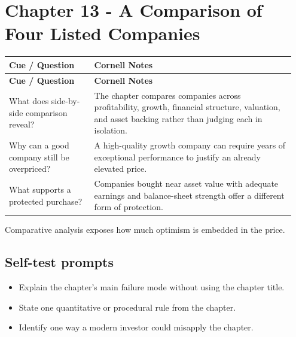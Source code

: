 \documentclass[11pt]{article}
\begin{document}
\section{Chapter 13 - A Comparison of Four Listed Companies}
\begin{longtable}{@{}>{\raggedright\arraybackslash}p{0.29\linewidth}>{\raggedright\arraybackslash}p{0.66\linewidth}@{}}\toprule\textbf{Cue / Question} & \textbf{Cornell Notes}\\\midrule\endfirsthead\toprule\textbf{Cue / Question} & \textbf{Cornell Notes}\\\midrule\endhead
What does side-by-side comparison reveal? & The chapter compares companies across profitability, growth, financial structure, valuation, and asset backing rather than judging each in isolation. \\
Why can a good company still be overpriced? & A high-quality growth company can require years of exceptional performance to justify an already elevated price. \\
What supports a protected purchase? & Companies bought near asset value with adequate earnings and balance-sheet strength offer a different form of protection. \\
\bottomrule\end{longtable}
\begin{principlebox}Comparative analysis exposes how much optimism is embedded in the price.\end{principlebox}
\subsection*{Self-test prompts}\begin{itemize}\item Explain the chapter's main failure mode without using the chapter title.\item State one quantitative or procedural rule from the chapter.\item Identify one way a modern investor could misapply the chapter.\end{itemize}
\end{document}
